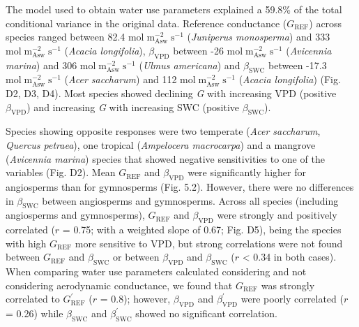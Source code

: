 \documentclass[11pt,twoside]{reedthesis}
\begin{document}
The model used to obtain water use parameters explained a 59.8\% of the
total conditional variance in the original data. Reference conductance
(\(G_{\text{REF}}\)) across species ranged between 82.4
\(\text{mol}\; \text{m}_{\text{Asw}}^{-2}\; \text{s}^{-1}\)
(\emph{Juniperus monosperma}) and 333
\(\text{mol}\; \text{m}_{\text{Asw}}^{-2}\; \text{s}^{-1}\)
(\emph{Acacia longifolia}), \(\beta_{\text{VPD}}\) between -26
\(\text{mol}\; \text{m}_{\text{Asw}}^{-2}\; \text{s}^{-1}\)
(\emph{Avicennia marina}) and 306
\(\text{mol}\; \text{m}_{\text{Asw}}^{-2}\; \text{s}^{-1}\) (\emph{Ulmus
americana}) and \(\beta_{\text{SWC}}\) between -17.3
\(\text{mol}\; \text{m}_{\text{Asw}}^{-2}\; \text{s}^{-1}\) (\emph{Acer
saccharum}) and 112
\(\text{mol}\; \text{m}_{\text{Asw}}^{-2}\; \text{s}^{-1}\)
(\emph{Acacia longifolia}) (Fig. D2, D3, D4). Most species showed
declining \emph{G} with increasing VPD (positive \(\beta_{\text{VPD}}\))
and increasing \emph{G} with increasing SWC (positive
\(\beta_{\text{SWC}}\)).\par

Species showing opposite responses were two temperate (\emph{Acer
saccharum}, \emph{Quercus petraea}), one tropical (\emph{Ampelocera
macrocarpa}) and a mangrove (\emph{Avicennia marina}) species that
showed negative sensitivities to one of the variables (Fig. D2). Mean
\(G_{\text{REF}}\) and \(\beta_{\text{VPD}}\) were significantly higher
for angiosperms than for gymnosperms (Fig. 5.2). However, there were no
differences in \(\beta_{\text{SWC}}\) between angiosperms and
gymnosperms. Across all species (including angiosperms and gymnosperms),
\(G_{\text{REF}}\) and \(\beta_{\text{VPD}}\) were strongly and
positively correlated (\(r\) = 0.75; with a weighted slope of 0.67; Fig.
D5), being the species with high \(G_{\text{REF}}\) more sensitive to
VPD, but strong correlations were not found between \(G_{\text{REF}}\)
and \(\beta_{\text{SWC}}\) or between \(\beta_{\text{VPD}}\) and
\(\beta_{\text{SWC}}\) (\textbar{}\(r\)\textbar{} \textless{} 0.34 in
both cases). When comparing water use parameters calculated considering
and not considering aerodynamic conductance, we found that
\(G_{\text{REF}}\) was strongly correlated to \(G_{\text{REF}}^{'}\)
(\(r\) = 0.8); however, \(\beta_{\text{VPD}}\) and
\(\beta_{\text{VPD}}^{'}\) were poorly correlated (\(r\) = 0.26) while
\(\beta_{\text{SWC}}\) and \(\beta_{\text{SWC}}^{'}\) showed no
significant correlation.\par

\vspace*{\fill} \newpage
\end{document}
